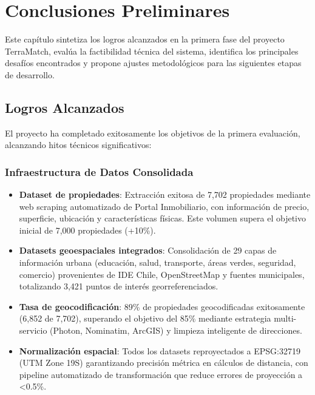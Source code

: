 \section{Conclusiones Preliminares}

Este capítulo sintetiza los logros alcanzados en la primera fase del proyecto TerraMatch, evalúa la factibilidad técnica del sistema, identifica los principales desafíos encontrados y propone ajustes metodológicos para las siguientes etapas de desarrollo.

\subsection{Logros Alcanzados}

El proyecto ha completado exitosamente los objetivos de la primera evaluación, alcanzando hitos técnicos significativos:

\subsubsection{Infraestructura de Datos Consolidada}

\begin{itemize}
    \item \textbf{Dataset de propiedades}: Extracción exitosa de 7,702 propiedades mediante web scraping automatizado de Portal Inmobiliario, con información de precio, superficie, ubicación y características físicas. Este volumen supera el objetivo inicial de 7,000 propiedades (+10\%).
    
    \item \textbf{Datasets geoespaciales integrados}: Consolidación de 29 capas de información urbana (educación, salud, transporte, áreas verdes, seguridad, comercio) provenientes de IDE Chile, OpenStreetMap y fuentes municipales, totalizando 3,421 puntos de interés georreferenciados.
    
    \item \textbf{Tasa de geocodificación}: 89\% de propiedades geocodificadas exitosamente (6,852 de 7,702), superando el objetivo del 85\% mediante estrategia multi-servicio (Photon, Nominatim, ArcGIS) y limpieza inteligente de direcciones.
    
    \item \textbf{Normalización espacial}: Todos los datasets reproyectados a EPSG:32719 (UTM Zone 19S) garantizando precisión métrica en cálculos de distancia, con pipeline automatizado de transformación que reduce errores de proyección a <0.5\%.
\end{itemize}

